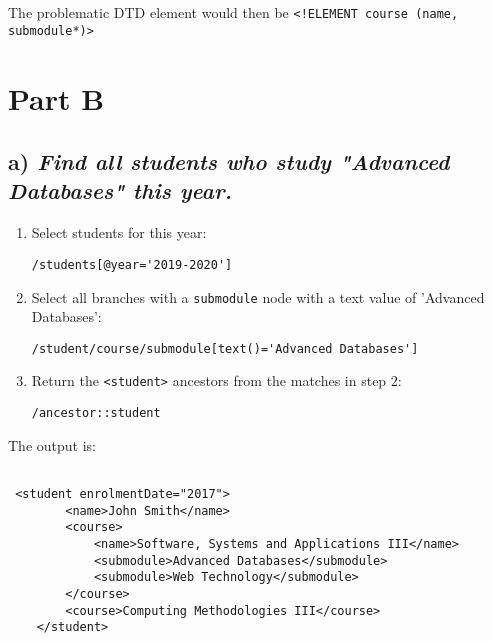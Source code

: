 \documentclass[11pt]{article} %
\begin{document}
The problematic DTD element would then be \verb|<!ELEMENT course (name, submodule*)>|

\clearpage

\section*{Part B}

\subsection*{a) \textit{Find all students who study "Advanced Databases" this year.}}

\begin{enumerate}

	\item{Select students for this year:} 

\begin{center}

	\verb|/students[@year='2019-2020']|

\end{center}

	\item{Select all branches with a \verb|submodule| node with a text value of 'Advanced Databases':}

\begin{center}

	\verb|/student/course/submodule[text()='Advanced Databases']|

\end{center}

	\item{Return the \verb|<student>| ancestors from the matches in step $2$:}

\begin{center}

	\verb|/ancestor::student|

\end{center}

\end{enumerate}

The output is:

\begin{verbatim}

 <student enrolmentDate="2017">
        <name>John Smith</name>
        <course>
            <name>Software, Systems and Applications III</name>
            <submodule>Advanced Databases</submodule>
            <submodule>Web Technology</submodule>
        </course>
        <course>Computing Methodologies III</course>
    </student>

\end{verbatim}
\end{document}
